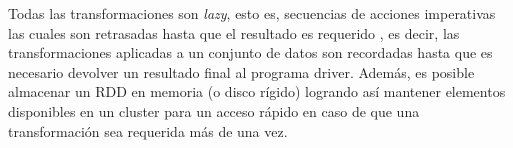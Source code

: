 \bigskip Todas las transformaciones son \textit{lazy}, esto es, secuencias de acciones imperativas las cuales son retrasadas hasta que el resultado es requerido \citep{launchbury1993lazy}, es decir, las transformaciones aplicadas a un conjunto de datos son recordadas hasta que es necesario devolver un resultado final al programa driver. Además, es posible almacenar un RDD en memoria (o disco rígido) logrando así mantener elementos disponibles en un cluster para un acceso rápido en caso de que una transformación sea requerida más de una vez.